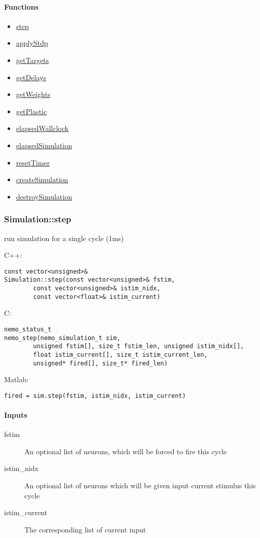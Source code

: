 \paragraph{Functions}
\begin{itemize}
\item \hyperref[fn: step]{step}
\item \hyperref[fn: applyStdp]{applyStdp}
\item \hyperref[fn: getTargets]{getTargets}
\item \hyperref[fn: getDelays]{getDelays}
\item \hyperref[fn: getWeights]{getWeights}
\item \hyperref[fn: getPlastic]{getPlastic}
\item \hyperref[fn: elapsedWallclock]{elapsedWallclock}
\item \hyperref[fn: elapsedSimulation]{elapsedSimulation}
\item \hyperref[fn: resetTimer]{resetTimer}
\item \hyperref[fn: createSimulation]{createSimulation}
\item \hyperref[fn: destroySimulation]{destroySimulation}
\end{itemize}
\clearpage
\subsubsection*{Simulation::step}
\label{fn: step}
run simulation for a single cycle (1ms)


\noindent C++:
\begin{lstlisting}[aboveskip=2pt]
const vector<unsigned>&
Simulation::step(const vector<unsigned>& fstim, 
        const vector<unsigned>& istim_nidx, 
        const vector<float>& istim_current)
\end{lstlisting}

\noindent C:
\begin{lstlisting}[aboveskip=2pt]
nemo_status_t
nemo_step(nemo_simulation_t sim, 
        unsigned fstim[], size_t fstim_len, unsigned istim_nidx[], 
        float istim_current[], size_t istim_current_len, 
        unsigned* fired[], size_t* fired_len)
\end{lstlisting}

\noindent Matlab:
\begin{lstlisting}[aboveskip=2pt]
fired = sim.step(fstim, istim_nidx, istim_current)
\end{lstlisting}
\paragraph{Inputs}
\begin{description}
\item[fstim] An optional list of neurons, which will be forced to fire this cycle
\item[istim\_nidx] An optional list of neurons which will be given input current stimulus this cycle
\item[istim\_current] The corresponding list of current input
\end{description}
